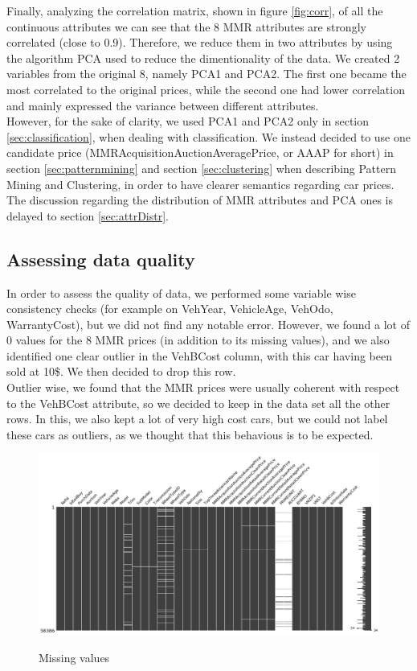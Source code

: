 \documentclass{article}
\begin{document}
	Finally, analyzing the correlation matrix, shown in figure \ref{fig:corr}, of all the continuous attributes we can see that the 8 MMR attributes are strongly correlated (close to 0.9). Therefore, we reduce them in two attributes by using the algorithm PCA used to reduce the dimentionality of the data. We created 2 variables from the original 8, namely PCA1 and PCA2. The first one became the most correlated to the original prices, while the second one had lower correlation and mainly expressed the variance between different attributes. \\
	However, for the sake of clarity, we used PCA1 and PCA2 only in section \ref{sec:classification}, when dealing with classification. We instead decided to use one candidate price (MMRAcquisitionAuctionAveragePrice, or AAAP for short) in section \ref{sec:patternmining} and section \ref{sec:clustering} when describing Pattern Mining and Clustering, in order to have clearer semantics regarding car prices. 
	The discussion regarding the distribution of MMR attributes and PCA ones is delayed to section \ref{sec:attrDistr}.
	
	
	\subsection{Assessing data quality}
	
	In order to assess the quality of data, we performed some variable wise consistency checks (for example on VehYear, VehicleAge, VehOdo, WarrantyCost), but we did not find any notable error. However, we found a lot of 0 values for the 8 MMR prices (in addition to its missing values), and we also identified one clear outlier in the VehBCost column, with this car having been sold at 10\$. We then decided to drop this row. \\
	Outlier wise, we found that the MMR prices were usually coherent with respect to the VehBCost attribute, so we decided to keep in the data set all the other rows. In this, we also kept a lot of very high cost cars, but we could not label these cars as outliers, as we thought that this behavious is to be expected.
	
	\begin{figure}[H]
		\centering
		{\includegraphics[width=.9\textwidth, height=.8\textheight, keepaspectratio]{missingv.png}}
		\caption{{ Missing values }}
		\label{fig:missingval}
	\end{figure}
	
\end{document}
